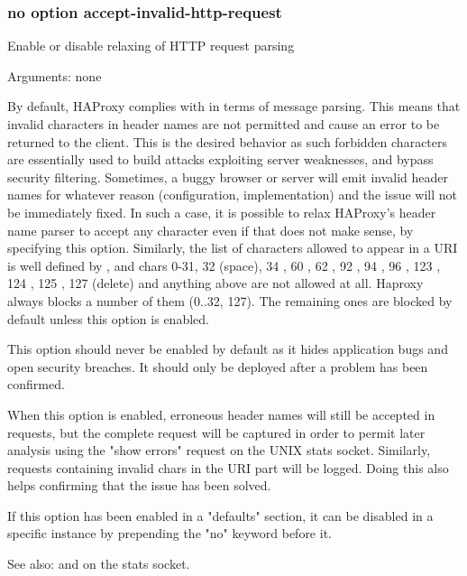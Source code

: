 \subsubsection*{no option accept-invalid-http-request}

  Enable or disable relaxing of HTTP request parsing


  Arguments: none

  By default, HAProxy complies with  in terms of message parsing. This
  means that invalid characters in header names are not permitted and cause an
  error to be returned to the client. This is the desired behavior as such
  forbidden characters are essentially used to build attacks exploiting server
  weaknesses, and bypass security filtering. Sometimes, a buggy browser or
  server will emit invalid header names for whatever reason (configuration,
  implementation) and the issue will not be immediately fixed. In such a case,
  it is possible to relax HAProxy's header name parser to accept any character
  even if that does not make sense, by specifying this option. Similarly, the
  list of characters allowed to appear in a URI is well defined by , and
  chars 0-31, 32 (space), 34 , 60 \chr{<}, 62 \chr{>}, 92 \chr{\bslash},
  94 \chr{\^}, 96 , 123 \chr{\{}, 124 \chr{|}, 125 \chr{\}}, 127 (delete)
  and anything above are not allowed at all.
  Haproxy always blocks a number of them (0..32, 127). The
  remaining ones are blocked by default unless this option is enabled.

  This option should never be enabled by default as it hides application bugs
  and open security breaches. It should only be deployed after a problem has
  been confirmed.

  When this option is enabled, erroneous header names will still be accepted in
  requests, but the complete request will be captured in order to permit later
  analysis using the "show errors" request on the UNIX stats socket. Similarly,
  requests containing invalid chars in the URI part will be logged. Doing this
  also helps confirming that the issue has been solved.

  If this option has been enabled in a "defaults" section, it can be disabled
  in a specific instance by prepending the "no" keyword before it.


See also:  and  on the
             stats socket.

